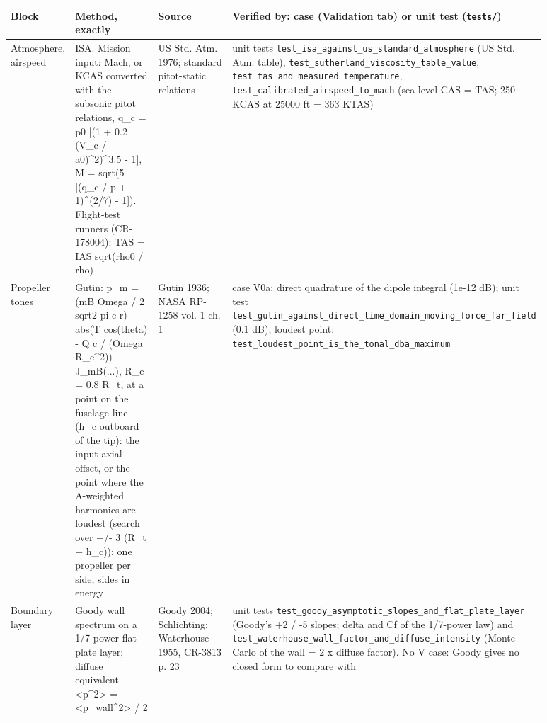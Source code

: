 \documentclass[10pt,a4paper]{article}
\begin{document}
{\small
\begin{longtable}{>{\raggedright\arraybackslash}p{0.095\linewidth}>{\raggedright\arraybackslash}p{0.276\linewidth}>{\raggedright\arraybackslash}p{0.233\linewidth}>{\raggedright\arraybackslash}p{0.276\linewidth}}
\hline
\textbf{Block} & \textbf{Method, exactly} & \textbf{Source} & \textbf{Verified by: case (Validation tab) or unit test (\texttt{tests/\allowbreak{}})} \\
\hline
\endhead
Atmosphere, airspeed & ISA. Mission input: Mach, or KCAS converted with the subsonic pitot relations, q\_c = p0 [(1 + 0.2 (V\_c / a0)\textasciicircum{}2)\textasciicircum{}3.5 - 1], M = sqrt(5 [(q\_c / p + 1)\textasciicircum{}(2/7) - 1]). Flight-test runners (CR-178004): TAS = IAS sqrt(rho0 / rho) & US Std. Atm. 1976; standard pitot-static relations & unit tests \texttt{test\_\allowbreak{}isa\_\allowbreak{}against\_\allowbreak{}us\_\allowbreak{}standard\_\allowbreak{}atmosphere} (US Std. Atm. table), \texttt{test\_\allowbreak{}sutherland\_\allowbreak{}viscosity\_\allowbreak{}table\_\allowbreak{}value}, \texttt{test\_\allowbreak{}tas\_\allowbreak{}and\_\allowbreak{}measured\_\allowbreak{}temperature}, \texttt{test\_\allowbreak{}calibrated\_\allowbreak{}airspeed\_\allowbreak{}to\_\allowbreak{}mach} (sea level CAS = TAS; 250 KCAS at 25000 ft = 363 KTAS) \\
Propeller tones & Gutin: p\_m = (mB Omega / 2 sqrt2 pi c r) abs(T cos(theta) - Q c / (Omega R\_e\textasciicircum{}2)) J\_mB(...), R\_e = 0.8 R\_t, at a point on the fuselage line (h\_c outboard of the tip): the input axial offset, or the point where the A-weighted harmonics are loudest (search over +/- 3 (R\_t + h\_c)); one propeller per side, sides in energy & Gutin 1936; NASA RP-1258 vol. 1 ch. 1 & case V0a: direct quadrature of the dipole integral (1e-12 dB); unit test \texttt{test\_\allowbreak{}gutin\_\allowbreak{}against\_\allowbreak{}direct\_\allowbreak{}time\_\allowbreak{}domain\_\allowbreak{}moving\_\allowbreak{}force\_\allowbreak{}far\_\allowbreak{}field} (0.1 dB); loudest point: \texttt{test\_\allowbreak{}loudest\_\allowbreak{}point\_\allowbreak{}is\_\allowbreak{}the\_\allowbreak{}tonal\_\allowbreak{}dba\_\allowbreak{}maximum} \\
Boundary layer & Goody wall spectrum on a 1/7-power flat-plate layer; diffuse equivalent <p\textasciicircum{}2> = <p\_wall\textasciicircum{}2> / 2 & Goody 2004; Schlichting; Waterhouse 1955, CR-3813 p. 23 & unit tests \texttt{test\_\allowbreak{}goody\_\allowbreak{}asymptotic\_\allowbreak{}slopes\_\allowbreak{}and\_\allowbreak{}flat\_\allowbreak{}plate\_\allowbreak{}layer} (Goody's +2 / -5 slopes; delta and Cf of the 1/7-power law) and \texttt{test\_\allowbreak{}waterhouse\_\allowbreak{}wall\_\allowbreak{}factor\_\allowbreak{}and\_\allowbreak{}diffuse\_\allowbreak{}intensity} (Monte Carlo of the wall = 2 x diffuse factor). No V case: Goody gives no closed form to compare with \\

\end{longtable}}
\end{document}
